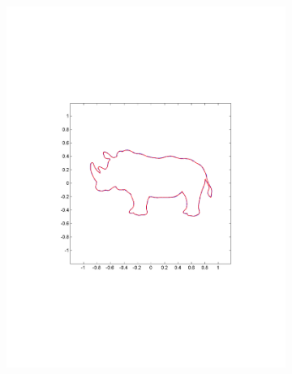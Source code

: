 \documentclass[review]{acmsiggraph}
\begin{document}
\begin{figure}
        \centering
		\begin{subfigure}[b]{0.3\linewidth}
                \centering
                \includegraphics[width=\textwidth]{images/rhenoceros/1.pdf}
       \end{subfigure}
		~
		\begin{subfigure}[b]{0.33\linewidth}
                \centering

\end{subfigure}
\end{figure}
\end{document}
